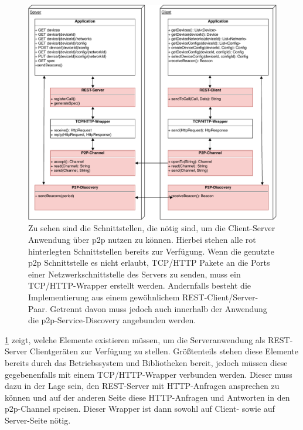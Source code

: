 	\begin{figure}[ht]
	\centering
    \includegraphics[width=1.0\textwidth]{IOT-Connectivity-Protocol-Stack}
    \caption{Zu sehen sind die Schnittstellen, die nötig sind, um die Client-Server Anwendung über p2p nutzen zu können. Hierbei stehen alle rot hinterlegten Schnittstellen bereits zur Verfügung. Wenn die genutzte p2p Schnittstelle es nicht erlaubt, TCP/HTTP Pakete an die Ports einer Netzwerkschnittstelle des Servers zu senden, muss ein TCP/HTTP-Wrapper erstellt werden. Andernfalls besteht die Implementierung aus einem gewöhnlichem REST-Client/Server-Paar. Getrennt davon muss jedoch auch innerhalb der Anwendung die p2p-Service-Discovery angebunden werden. }
    \label{protocol_stack}
\end{figure}

    \figurename \ref{protocol_stack} zeigt, welche Elemente existieren müssen, um die Serveranwendung als REST-Server Clientgeräten zur Verfügung zu stellen. Größtenteils stehen diese Elemente bereits durch das Betriebssystem und Bibliotheken bereit, jedoch müssen diese gegebenenfalls mit einem TCP/HTTP-Wrapper verbunden werden. Dieser muss dazu in der Lage sein, den REST-Server mit HTTP-Anfragen ansprechen zu können und auf der anderen Seite diese HTTP-Anfragen und Antworten in den p2p-Channel speisen. Dieser Wrapper ist dann sowohl auf Client- sowie auf Server-Seite nötig. 
